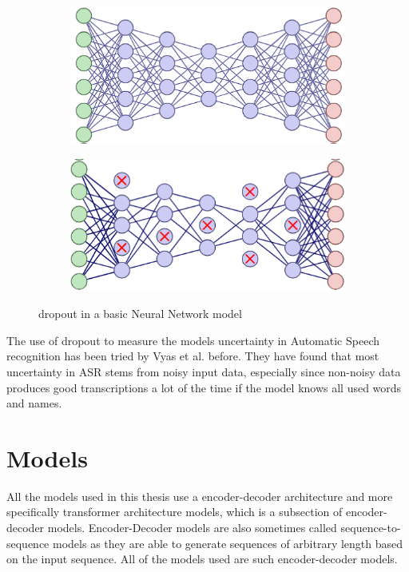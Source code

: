 \begin{figure}[ht]
    \centering
    \begin{subfigure}{0.45\textwidth}
        \includegraphics[width=\linewidth]{Latex//sections//images/nondropout.png}
    \end{subfigure}
    \begin{subfigure}{0.45\textwidth}
        \includegraphics[width=\linewidth]{Latex//sections//images/dropout.png}
    \end{subfigure}
    
    \caption{dropout in a basic Neural Network model}
    \label{fig:dropout}
\end{figure}

The use of dropout to measure the models uncertainty in Automatic Speech recognition has been tried by Vyas et al. \cite{8683086} before.
They have found that most uncertainty in ASR stems from noisy input data, especially since non-noisy data produces good transcriptions a lot of the time if the model knows all used words and names. 


\section{Models}
\label{ch:models}
All the models used in this thesis use a encoder-decoder architecture and more specifically transformer architecture models, which is a subsection of encoder-decoder models. Encoder-Decoder models are also sometimes called sequence-to-sequence models as they are able to generate sequences of arbitrary length based on the input sequence.
All of the models used are such encoder-decoder models. 

